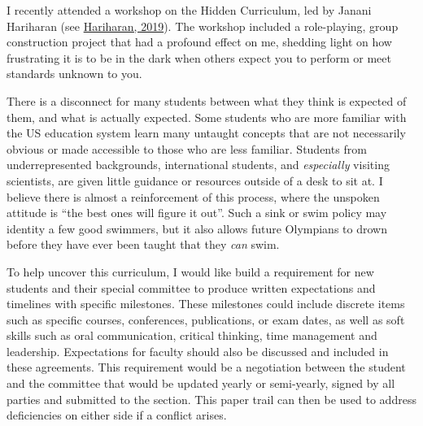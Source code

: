 \documentclass[11pt]{article}
\newcommand{\amy}[1]{{\color{amyCol} [\textbf{Amy:} #1]}}
\begin{document}


I recently attended a workshop on the Hidden Curriculum, led by Janani Hariharan (see \href{https://science.sciencemag.org/content/364/6441/702.full}{Hariharan, 2019}). The workshop included a role-playing, group construction project that had a profound effect on me, shedding light on how frustrating it is to be in the dark when others expect you to perform or meet standards unknown to you. 

There is a disconnect for many students between what they think is expected of them, and what is actually expected. Some students who are more familiar with the US education system learn many untaught concepts that are not necessarily obvious or made accessible to those who are less familiar. Students from underrepresented backgrounds, international students, and \emph{especially} visiting scientists, are given little guidance or resources outside of a desk to sit at. I believe there is almost a reinforcement of this process, where the unspoken attitude is ``the best ones will figure it out''. Such a sink or swim policy may identity a few good swimmers, but it also allows future Olympians to drown before they have ever been taught that they \emph{can} swim. %




To help uncover this curriculum, I would like build a requirement for new students and their special committee to produce written expectations and timelines with specific milestones. These milestones could include discrete items such as specific courses, conferences, publications, or exam dates, as well as soft skills such as oral communication, critical thinking, time management and leadership. Expectations for faculty should also be discussed and included in these agreements. This requirement would be a negotiation between the student and the committee that would be updated yearly or semi-yearly, signed by all parties and submitted to the section. This paper trail can then be used to address deficiencies on either side if a conflict arises. 
\end{document}
